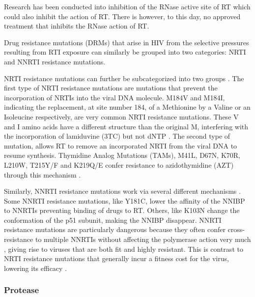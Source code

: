 \documentclass[
  11pt,
  twoside]{scrbook}
\begin{document}
Research has been conducted into inhibition of the RNase active site of RT \autocite{hangActivityIsolatedHIV2004,klumppRecentProgressDesign2006} which could also inhibit the action of RT. There is however, to this day, no approved treatment that inhibits the RNase action of RT.

Drug resistance mutations (DRMs) that arise in HIV from the selective pressures resulting from RTI exposure can similarly be grouped into two categories: NRTI and NNRTI resistance mutations.

NRTI resistance mutations can further be subcategorized into two groups \autocite{menendez-ariasMechanismsResistanceNucleoside2008,sluis-cremerMolecularMechanismsHIV12000}. The first type of NRTI resistance mutations are mutations that prevent the incorporation of NRTIs into the viral DNA molecule. M184V and M184I, indicating the replacement, at site number 184, of a Methionine by a Valine or an Isoleucine respectively, are very common NRTI resistance mutations. These V and I amino acids have a different structure than the original M, interfering with the incorporation of lamiduvine (3TC) but not dNTP \autocite{sarafianosLamivudine3TCResistance1999}. The second type of mutation, allows RT to remove an incorporated NRTI from the viral DNA to resume synthesis. Thymidine Analog Mutations (TAMs), M41L, D67N, K70R, L210W, T215Y/F and K219Q/E confer resistance to azidothymidine (AZT) through this mechanism \autocite{meyerMechanismAZTResistance1999,boyerSelectiveExcisionAZTMP2001}.

Similarly, NNRTI resistance mutations work via several different mechanisms \autocite{deeksNonnucleosideReverseTranscriptase2001,renStructuralBasisDrug2008}. Some NNRTI resistance mutations, like Y181C, lower the affinity of the NNIBP to NNRTIs preventing binding of drugs to RT. Others, like K103N change the conformation of the p51 subunit, making the NNIBP disappear. NNRTI resistance mutations are particularly dangerous because they often confer cross-resistance to multiple NNRTIs without affecting the polymerase action very much \autocite{ammaranondMechanismHIVAntiretroviral2012}, giving rise to viruses that are both fit and highly resistant. This is contrast to NRTI resistance mutations that generally incur a fitness cost for the virus, lowering its efficacy \autocite{lloydHighCostFidelity2014}.

\hypertarget{protease}{%
\subsubsection{Protease}\label{protease}}
\end{document}
